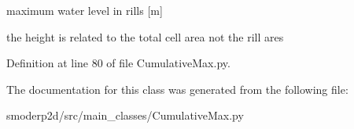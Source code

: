 maximum water level in rills \mbox{[}m\mbox{]} 

the height is related to the total cell area not the rill ares 

Definition at line 80 of file Cumulative\-Max.\-py.



The documentation for this class was generated from the following file\-:\begin{DoxyCompactItemize}
\item 
smoderp2d/src/main\-\_\-classes/Cumulative\-Max.\-py\end{DoxyCompactItemize}
